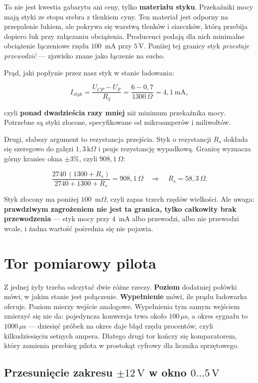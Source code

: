 \documentclass[a4paper,11pt]{article}
\newcommand{\ohm}{\,\Omega}
\newcommand{\kohm}{\,\mathrm{k}\Omega}
\newcommand{\volt}{\,\mathrm{V}}
\newcommand{\us}{\,\mu\mathrm{s}}
\begin{document}
To nie jest kwestia gabarytu ani ceny, tylko \textbf{materiału styku}. Przekaźniki
mocy mają styki ze stopu srebra z tlenkiem cyny. Ten materiał jest odporny na
przepalenie łukiem, ale pokrywa się warstwą tlenków i siarczków, którą przebija
dopiero łuk przy załączaniu obciążenia. Producenci podają dla nich minimalne
obciążenie łączeniowe rzędu $100$~mA przy $5\volt$. Poniżej tej granicy styk
\emph{przestaje przewodzić} --- zjawisko znane jako łączenie na sucho.

Prąd, jaki popłynie przez nasz styk w stanie ładowania:

\[
I_{styk}=\frac{U_{CP}-U_{F}}{R_3}=\frac{6-0{,}7}{1300\ohm}=4{,}1\ \mathrm{mA},
\]

czyli \textbf{ponad dwadzieścia razy mniej} niż minimum przekaźnika mocy. Potrzebne
są styki złocone, specyfikowane od mikroamperów i miliwoltów.

Drugi, słabszy argument to rezystancja przejścia. Styk o rezystancji $R_s$ dokłada
się szeregowo do gałęzi $1{,}3\kohm$ i psuje rezystancję wypadkową. Granicę
wyznacza górny kraniec okna $\pm3\%$, czyli $908{,}1\ohm$:

\[
\frac{2740\,(1300+R_s)}{2740+1300+R_s}=908{,}1\ohm
\quad\Longrightarrow\quad
R_s = 58{,}3\ohm .
\]

Styk złocony ma poniżej $100$~m$\Omega$, czyli zapas trzech rzędów wielkości. Ale
uwaga: \textbf{prawdziwym zagrożeniem nie jest ta granica, tylko całkowity brak
przewodzenia} --- styk mocy przy $4$~mA albo przewodzi, albo nie przewodzi wcale,
i żadna wartość pośrednia się nie pojawia.

\section{Tor pomiarowy pilota}
\label{sec:pomiar}

Z jednej żyły trzeba odczytać dwie różne rzeczy. \textbf{Poziom} dodatniej połówki
mówi, w jakim stanie jest połączenie. \textbf{Wypełnienie} mówi, ile prądu
ładowarka oferuje. Poziom mierzy wejście analogowe. Wypełnienia tym samym wejściem
zmierzyć się nie da: pojedyncza konwersja trwa około $100\us$, a okres sygnału to
$1000\us$ --- dziesięć próbek na okres daje błąd rzędu procentów, czyli
kilkudziesięciu setnych ampera. Dlatego drugi tor kończy się komparatorem, który
zamienia przebieg pilota w prostokąt cyfrowy dla licznika sprzętowego.

\subsection{Przesunięcie zakresu \texorpdfstring{$\pm12\volt$}{+/-12 V} w okno
\texorpdfstring{$0\ldots5\volt$}{0...5 V}}
\end{document}
